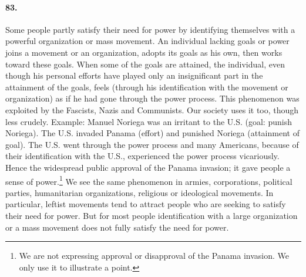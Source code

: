 \documentclass[12pt]{book}
\begin{document}
\paragraph{83.} Some people partly satisfy their need for power by identifying themselves with a powerful organization or mass movement. An individual lacking goals or power joins a movement or an organization, adopts its goals as his own, then works toward these goals. When some of the goals are attained, the individual, even though his personal efforts have played only an insignificant part in the attainment of the goals, feels (through his identification with the movement or organization) as if he had gone through the power process. This phenomenon was exploited by the Fascists, Nazis and Communists. Our society uses it too, though less crudely. Example: Manuel Noriega was an irritant to the U.S. (goal: punish Noriega). The U.S. invaded Panama (effort) and punished Noriega (attainment of goal). The U.S. went through the power process and many Americans, because of their identification with the U.S., experienced the power process vicariously. Hence the widespread public approval of the Panama invasion; it gave people a sense of power.\footnote{We are not expressing approval or disapproval of the Panama invasion. We only use it to illustrate a point.} We see the same phenomenon in armies, corporations, political parties, humanitarian organizations, religious or ideological movements. In particular, leftist movements tend to attract people who are seeking to satisfy their need for power. But for most people identification with a large organization or a mass movement does not fully satisfy the need for power.
\end{document}
